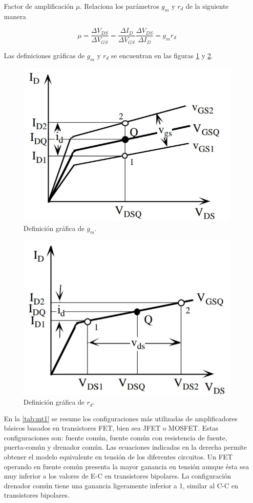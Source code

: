 \documentclass[12pt, a4paper]{article}
\begin{document}
    Factor de amplificación $\mu$. Relaciona los parámetros $g_m$ y $r_d$ de la siguiente manera

    \begin{equation} \label{eqmu}
        \mu = \frac{\Delta V_{DS}}{\Delta V_{GS}} = \frac{\Delta I_D}{\Delta V_{GS}}\frac{\Delta V_{DS}}{\Delta I_D} = g_mr_d
    \end{equation}

    Las definiciones gráficas de $g_m$ y $r_d$ se encuentran en las figuras \ref{fig:mt2} y \ref{fig:mt3}.

    \begin{figure}[h!]
        \centering
        \includegraphics[height=5cm\textwidth]{grafgm.jpg}
        \caption{Definición gráfica de $g_m$.}
        \label{fig:mt2}
    \end{figure}

    \begin{figure}[h!]
        \centering
        \includegraphics[height=5cm\textwidth]{grafrd.jpg}
        \caption{Definición gráfica de $r_d$.}
        \label{fig:mt3}
    \end{figure}

    En la \ref{tab:mt1} se resume los configuraciones más utilizadas de amplificadores básicos basados en transistores FET, bien sea JFET o MOSFET. Estas configuraciones son: fuente común, fuente común con resistencia de fuente, puerta-común y drenador común. Las ecuaciones indicadas en la derecha permite obtener el modelo equivalente en tensión de los diferentes circuitos. Un FET operando en fuente común presenta la mayor ganancia en tensión aunque ésta sea muy inferior a los valores de E-C en transistores bipolares. La configuración drenador común tiene una ganancia ligeramente inferior a 1, similar al C-C en transistores bipolares.
\end{document}
